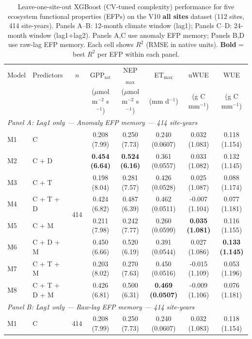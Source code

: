 \begin{table}[htbp]
\centering
\caption{Leave-one-site-out XGBoost (CV-tuned complexity) performance for five ecosystem functional properties (EFPs) on the V10 \textbf{all sites} dataset (112 sites, 414 site-years). Panels A--B: 12-month climate window (lag1); Panels C--D: 24-month window (lag1+lag2). Panels A,C use anomaly EFP memory; Panels B,D use raw-lag EFP memory. Each cell shows $R^2$ (RMSE in native units). \textbf{Bold} = best $R^2$ per EFP within each panel.}
\label{tab:XGBtuned_LOSO_v10_all_sites}
\footnotesize
\setlength{\tabcolsep}{4pt}
\begin{tabular}{llcccccc}
\toprule
Model & Predictors & $n$ & GPP$_\mathrm{sat}$ & NEP$_\mathrm{max}$ & ET$_\mathrm{max}$ & uWUE & WUE \\
  &  &  & ($\mu$mol m$^{-2}$ s$^{-1}$) & ($\mu$mol m$^{-2}$ s$^{-1}$) & (mm d$^{-1}$) & (g C mm$^{-1}$) & (g C mm$^{-1}$) \\
\midrule
\multicolumn{8}{l}{\textit{Panel A: Lag1 only --- Anomaly EFP memory --- 414 site-years}} \\
\midrule
M1 & C & \multirow{8}{*}{414} & 0.208 (7.99) & 0.250 (7.73) & 0.240 (0.0607) & 0.032 (1.083) & 0.118 (1.154) \\
M2 & C + D &  & \textbf{0.454 (6.64)} & \textbf{0.524 (6.16)} & 0.361 (0.0557) & 0.033 (1.082) & 0.132 (1.145) \\
M3 & C + T &  & 0.198 (8.04) & 0.281 (7.57) & 0.426 (0.0528) & 0.025 (1.087) & 0.088 (1.174) \\
M4 & C + T + D &  & 0.424 (6.82) & 0.487 (6.39) & 0.462 (0.0511) & -0.007 (1.104) & 0.077 (1.181) \\
M5 & C + M &  & 0.211 (7.98) & 0.242 (7.77) & 0.260 (0.0599) & \textbf{0.035 (1.081)} & 0.116 (1.155) \\
M6 & C + D + M &  & 0.450 (6.66) & 0.520 (6.19) & 0.391 (0.0544) & 0.027 (1.086) & \textbf{0.133 (1.145)} \\
M7 & C + T + M &  & 0.203 (8.02) & 0.270 (7.63) & 0.450 (0.0516) & -0.015 (1.109) & 0.053 (1.196) \\
M8 & C + T + D + M &  & 0.426 (6.81) & 0.500 (6.31) & \textbf{0.469 (0.0507)} & -0.009 (1.106) & 0.076 (1.181) \\
\midrule
\multicolumn{8}{l}{\textit{Panel B: Lag1 only --- Raw-lag EFP memory --- 414 site-years}} \\
\midrule
M1 & C & \multirow{8}{*}{414} & 0.208 (7.99) & 0.250 (7.73) & 0.240 (0.0607) & 0.032 (1.083) & 0.118 (1.154) \\

\end{tabular}
\end{table}
